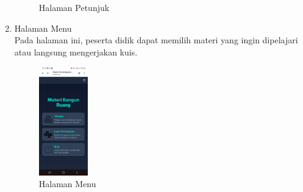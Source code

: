 \documentclass[12pt]{article}
\begin{document}
\begin{enumerate}
\begin{figure}[H]
        \caption{Halaman Petunjuk}
        \label{fig:petunjuk}
    \end{figure}
    \item Halaman Menu\\
    \hspace*{1cm}Pada halaman ini, peserta didik dapat memilih materi yang ingin dipelajari atau langsung mengerjakan kuis.
    \begin{figure}[H]
        \centering
        \includegraphics[width=0.2\textwidth]{images/menu.jpg}
        \caption{Halaman Menu}
        \label{fig:menu}
    \end{figure}


\end{enumerate}
\end{document}
